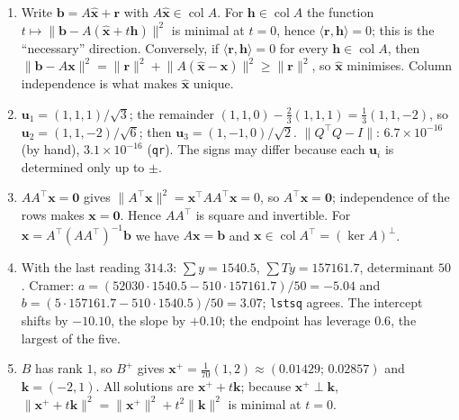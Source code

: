 \begin{enumerate}[label=\textbf{10.\arabic*}]
  \item 
Write $\mathbf{b}=A\hat{\mathbf{x}}+\mathbf{r}$ with
        $A\hat{\mathbf{x}}\in\operatorname{col}A$. For
        $\mathbf{h}\in\operatorname{col}A$ the function
        $t\mapsto\lVert\mathbf{b}-A(\hat{\mathbf{x}}+t\mathbf{h})\rVert^{2}$ is
        minimal at $t=0$, hence $\langle\mathbf{r},\mathbf{h}\rangle=0$; this is the
        ``necessary'' direction. Conversely, if
        $\langle\mathbf{r},\mathbf{h}\rangle=0$ for every
        $\mathbf{h}\in\operatorname{col}A$, then
        $\lVert\mathbf{b}-A\mathbf{x}\rVert^{2}=\lVert\mathbf{r}\rVert^{2}+\lVert
        A(\hat{\mathbf{x}}-\mathbf{x})\rVert^{2}\ge\lVert\mathbf{r}\rVert^{2}$, so
        $\hat{\mathbf{x}}$ minimises. Column independence is what makes
        $\hat{\mathbf{x}}$ unique.

  \item $\mathbf{u}_{1}=(1,1,1)/\sqrt3$; the remainder $(1,1,0)-\frac23(1,1,1)
        =\frac13(1,1,-2)$, so $\mathbf{u}_{2}=(1,1,-2)/\sqrt6$; then
        $\mathbf{u}_{3}=(1,-1,0)/\sqrt2$. $\lVert Q^{\top}Q-I\rVert$:
        $6.7\times10^{-16}$ (by hand), $3.1\times10^{-16}$ (\texttt{qr}).
        The signs may differ because each $\mathbf{u}_{i}$ is determined only up to
        $\pm$.

  \item $AA^{\top}\mathbf{x}=\mathbf{0}$ gives
        $\lVert A^{\top}\mathbf{x}\rVert^{2}=\mathbf{x}^{\top}AA^{\top}
        \mathbf{x}=0$, so $A^{\top}\mathbf{x}=\mathbf{0}$; independence of the rows
        makes $\mathbf{x}=\mathbf{0}$. Hence $AA^{\top}$ is square and invertible.
        For $\mathbf{x}=A^{\top}(AA^{\top})^{-1}\mathbf{b}$ we have
        $A\mathbf{x}=\mathbf{b}$ and
        $\mathbf{x}\in\operatorname{col}A^{\top}=(\ker A)^{\perp}$.

  \item With the last reading $314.3$: $\sum y=1540.5$,
        $\sum Ty=157161.7$, determinant $50$. Cramer:
        $a=(52030\cdot1540.5-510\cdot157161.7)/50=-5.04$ and
        $b=(5\cdot157161.7-510\cdot1540.5)/50=3.07$;
        \texttt{lstsq} agrees. The intercept shifts by $-10.10$, the slope by $+0.10$;
        the endpoint has leverage $0.6$, the largest of the five.

  \item $B$ has rank $1$, so $B^{+}$ gives
        $\mathbf{x}^{+}=\frac{1}{70}(1,2)\approx(0.01429;\,0.02857)$ and
        $\mathbf{k}=(-2,1)$. All solutions are $\mathbf{x}^{+}+t\mathbf{k}$;
        because $\mathbf{x}^{+}\perp\mathbf{k}$,
        $\lVert\mathbf{x}^{+}+t\mathbf{k}\rVert^{2}=\lVert\mathbf{x}^{+}
        \rVert^{2}+t^{2}\lVert\mathbf{k}\rVert^{2}$ is minimal at $t=0$.
\end{enumerate}

